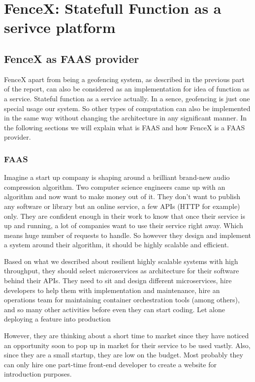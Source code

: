 \documentclass[a4]{report}
\begin{document}
    \part[Stateful FAAS]{FenceX: Statefull Function as a serivce platform}

    \chapter{FenceX as FAAS provider}
    FenceX apart from being a geofencing system, as described in the previous part of the report, can also be
    considered as an implementation for idea of function as a service.
    Stateful function as a service actually.
    In a sence, geofencing is just one special usage our system.
    So other types of computation can also be implemented in the same way without changing the architecture in any
    significant manner.
    In the following sections we will explain what is FAAS and how FenceX is a FAAS provider.

    \section{FAAS}
    Imagine a start up company is shaping around a brilliant brand-new audio compression algorithm.
    Two computer science engineers came up with an algorithm and now want to make money out of it.
    They don't want to publish any software or library but an online service, a few APIs (HTTP for example) only.
    They are confident enough in their work to know that once their service is up and running, a lot of companies
    want to use their service right away.
    Which means huge number of requests to handle.
    So however they design and implement a system around their algorithm, it should be highly scalable and efficient.

    Based on what we described about resilient highly scalable systems with high throughput, they should select
    microservices as architecture for their software behind their APIs.
    They need to sit and design different microservices, hire developers to help them with implementation and
    maintenance, hire an operations team for maintaining container orchestration tools (among others), and so many
    other activities before even they can start coding.
    Let alone deploying a feature into production

    However, they are thinking about a short time to market since they have noticed an opportunity soon to pop up in
    market for their service to be used vastly.
    Also, since they are a small startup, they are low on the budget.
    Most probably they can only hire one part-time front-end developer to create a website for introduction
    purposes.
\end{document}
